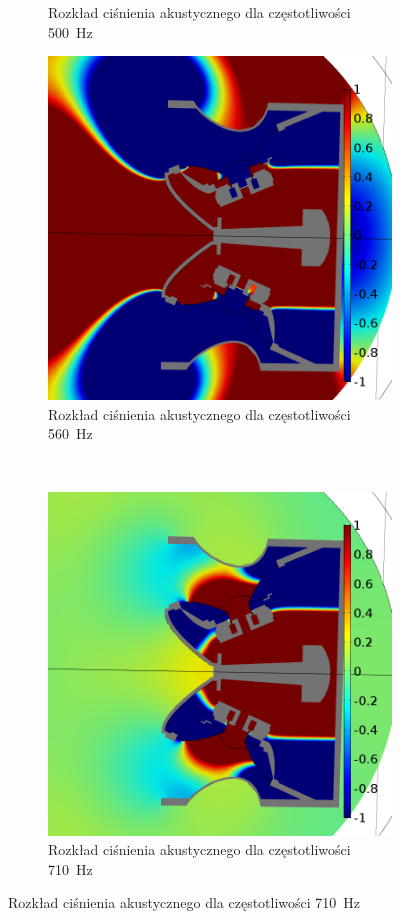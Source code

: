 \documentclass[12pt]{oska}
\begin{document}
\begin{figure}[!ht]
\begin{subfigure}[b]{.49\textwidth}
				\caption{Rozkład ciśnienia akustycznego dla częstotliwości \SI{500}{\hertz}}
				\label{r:C_500}
			\end{subfigure}
			
			\begin{subfigure}[b]{.49\textwidth}
			\includegraphics[width=\textwidth]{pres_sig_560Hz.png}
				\caption{Rozkład ciśnienia akustycznego dla częstotliwości \SI{560}{\hertz}}
				\label{r:C_560}
			\end{subfigure}
			~
			\begin{subfigure}[b]{.49\textwidth}
			\includegraphics[width=\textwidth]{pres_sig_710Hz.png}
				\caption{Rozkład ciśnienia akustycznego dla częstotliwości \SI{710}{\hertz}}
				\label{r:C_710}
			\end{subfigure}
			

\end{figure}
\end{document}
